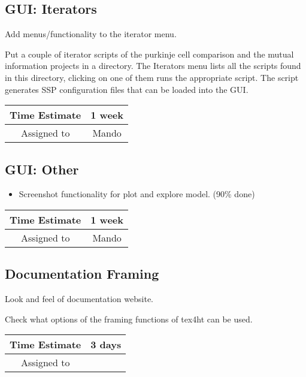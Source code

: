 \documentclass[12pt]{article}
\begin{document}
\subsection{GUI: Iterators}
Add menus/functionality to the iterator menu.

Put a couple of iterator scripts of the purkinje cell comparison and
the mutual information projects in a directory.  The Iterators menu
lists all the scripts found in this directory, clicking on one of them
runs the appropriate script.  The script generates SSP configuration
files that can be loaded into the GUI.

\begin{center}
  \vspace{5mm}
  \centering
  \begin{tabular}{|c|c|}
    \hline
    Time Estimate
    & 1 week \\
    \hline
    Assigned to
    & Mando \\
    \hline
  \end{tabular}
\end{center}


\subsection{GUI: Other}
\begin{itemize}
\item Screenshot functionality for plot and explore model. (90\% done)
\end{itemize}

\begin{center}
  \vspace{5mm}
  \centering
  \begin{tabular}{|c|c|}
    \hline
    Time Estimate
    & 1 week \\
    \hline
    Assigned to
    & Mando \\
    \hline
  \end{tabular}
\end{center}


\subsection{Documentation Framing}

Look and feel of documentation website.

Check what options of the framing functions of tex4ht can be used.


\begin{center}
  \vspace{5mm}
  \centering
  \begin{tabular}{|c|c|}
    \hline
    Time Estimate
    & 3 days \\
    \hline
    Assigned to
    & \\
    \hline
  \end{tabular}
\end{center}
\end{document}
